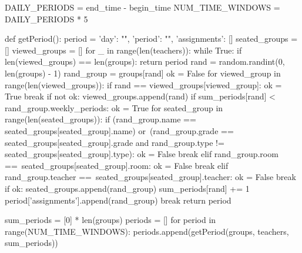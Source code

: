 \documentclass[12pt,a4paper]{report}
\begin{document}
\begin{python}
DAILY_PERIODS = end_time - begin_time
NUM_TIME_WINDOWS = DAILY_PERIODS * 5


def getPeriod():
    period = {'day': "", 'period': "", 'assignments': []}
    seated_groups = []
    viewed_groups = []
    for _ in range(len(teachers)):
        while True:
            if len(viewed_groups) == len(groups):
                return period
            rand = random.randint(0, len(groups) - 1)
            rand_group = groups[rand]
            ok = False
            for viewed_group in range(len(viewed_groups)):
                if rand == viewed_groups[viewed_group]:
                    ok = True
                    break
            if not ok:
                viewed_groups.append(rand)
                if sum_periods[rand] < rand_group.weekly_periods:
                    ok = True
                    for seated_group in range(len(seated_groups)):
                        if (rand_group.name ==
                           seated_groups[seated_group].name) or\
                           (rand_group.grade == 
                           seated_groups[seated_group].grade and
                           rand_group.type != 
                           seated_groups[seated_group].type):
                            ok = False
                            break
                        elif rand_group.room ==\
                           seated_groups[seated_group].room:
                            ok = False
                            break
                        elif rand_group.teacher ==\
                           seated_groups[seated_group].teacher:
                            ok = False
                            break
                    if ok:
                        seated_groups.append(rand_group)
                        sum_periods[rand] += 1
                        period['assignments'].append(rand_group)
                        break
    return period


sum_periods = [0] * len(groups)
    periods = []
    for period in range(NUM_TIME_WINDOWS):
        periods.append(getPeriod(groups, teachers, sum_periods))
\end{python}
\end{document}

